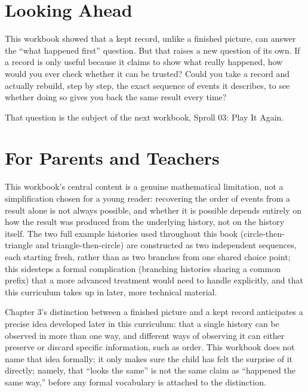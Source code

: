\documentclass[11pt]{book}
\begin{document}
\chapter*{Looking Ahead}

This workbook showed that a kept record, unlike a finished picture, can answer the ``what happened first'' question. But that raises a new question of its own. If a record is only useful because it claims to show what really happened, how would you ever check whether it can be trusted? Could you take a record and actually rebuild, step by step, the exact sequence of events it describes, to see whether doing so gives you back the same result every time?

That question is the subject of the next workbook, Sproll 03: Play It Again.

\chapter*{For Parents and Teachers}

This workbook's central content is a genuine mathematical limitation, not a simplification chosen for a young reader: recovering the order of events from a result alone is not always possible, and whether it is possible depends entirely on how the result was produced from the underlying history, not on the history itself. The two full example histories used throughout this book (circle-then-triangle and triangle-then-circle) are constructed as two independent sequences, each starting fresh, rather than as two branches from one shared choice point; this sidesteps a formal complication (branching histories sharing a common prefix) that a more advanced treatment would need to handle explicitly, and that this curriculum takes up in later, more technical material.

Chapter 3's distinction between a finished picture and a kept record anticipates a precise idea developed later in this curriculum: that a single history can be observed in more than one way, and different ways of observing it can either preserve or discard specific information, such as order. This workbook does not name that idea formally; it only makes sure the child has felt the surprise of it directly; namely, that ``looks the same'' is not the same claim as ``happened the same way,'' before any formal vocabulary is attached to the distinction.
\end{document}
